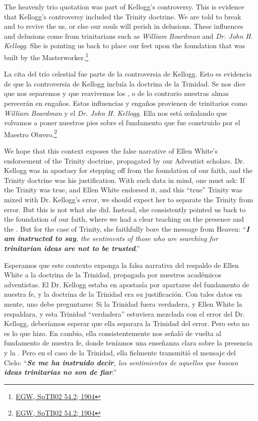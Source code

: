 The heavenly trio quotation was part of Kellogg's controversy. This is evidence that Kellogg’s controversy included the Trinity doctrine. We are told to break  and to revive the  us, or else our souls will perish in delusions. These influences and delusions come from trinitarians such as \textit{William Boardman} and \textit{Dr. John H. Kellogg}. She is pointing us back to place our feet upon the foundation that was built by the Masterworker.\footnote{\href{https://egwwritings.org/?ref=en_SpTB02.54.2&para=417.276}{EGW, SpTB02 54.2; 1904}}


La cita del trío celestial fue parte de la controversia de Kellogg. Esto es evidencia de que la controversia de Kellogg incluía la doctrina de la Trinidad. Se nos dice que nos separemos  y que reavivemos los , o de lo contrario nuestras almas perecerán en engaños. Estas influencias y engaños provienen de trinitarios como \textit{William Boardman} y el \textit{Dr. John H. Kellogg}. Ella nos está señalando que volvamos a poner nuestros pies sobre el fundamento que fue construido por el Maestro Obrero.\footnote{\href{https://egwwritings.org/?ref=en_SpTB02.54.2&para=417.276}{EGW, SpTB02 54.2; 1904}}


We hope that this context exposes the false narrative of Ellen White's endorsement of the Trinity doctrine, propagated by our Adventist scholars. Dr. Kellogg was in apostasy for stepping off from the foundation of our faith, and the Trinity doctrine was his justification. With such data in mind, one must ask: If the Trinity was true, and Ellen White endorsed it, and this “true” Trinity was mixed with Dr. Kellogg's error, we should expect her to separate the Trinity from error. But this is not what she did. Instead, she consistently pointed us back to the foundation of our faith, where we had a clear teaching on the presence and the . But for the case of Trinity, she faithfully bore the message from Heaven: “\textit{\textbf{I am instructed to say}, the sentiments of those who are searching for \textbf{trinitarian ideas are not to be trusted}}.”


Esperamos que este contexto exponga la falsa narrativa del respaldo de Ellen White a la doctrina de la Trinidad, propagada por nuestros académicos adventistas. El Dr. Kellogg estaba en apostasía por apartarse del fundamento de nuestra fe, y la doctrina de la Trinidad era su justificación. Con tales datos en mente, uno debe preguntarse: Si la Trinidad fuera verdadera, y Ellen White la respaldara, y esta Trinidad “verdadera” estuviera mezclada con el error del Dr. Kellogg, deberíamos esperar que ella separara la Trinidad del error. Pero esto no es lo que hizo. En cambio, ella consistentemente nos señaló de vuelta al fundamento de nuestra fe, donde teníamos una enseñanza clara sobre la presencia y la . Pero en el caso de la Trinidad, ella fielmente transmitió el mensaje del Cielo: “\textit{\textbf{Se me ha instruido decir}, los sentimientos de aquellos que buscan \textbf{ideas trinitarias no son de fiar}}.”





% 
